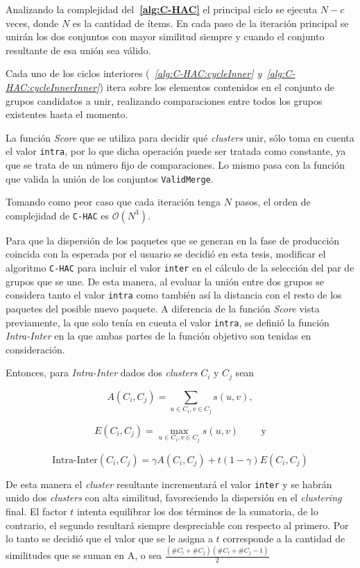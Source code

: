 Analizando la complejidad del\textbf{~\autoref{alg:C-HAC}} el principal ciclo se ejecuta $N - c$ veces, donde $N$ es la cantidad de ítems. En cada paso de la iteración principal se unirán los dos conjuntos con mayor similitud siempre y cuando el conjunto resultante de esa unión sea válido.

Cada uno de los ciclos interiores (\textit{~\autoref{alg:C-HAC:cycleInner} y~\autoref{alg:C-HAC:cycleInnerInner}}) itera sobre los elementos contenidos en el conjunto de grupos candidatos a unir, realizando comparaciones entre todos los grupos existentes hasta el momento. 

La función \textit{Score} que se utiliza para decidir qué {\em clusters} unir, sólo toma en cuenta el valor \texttt{intra}, por lo que dicha operación puede ser tratada como constante, ya que se trata de un número fijo de comparaciones. Lo mismo pasa con la función que valida la unión de los conjuntos \texttt{ValidMerge}.

Tomando como peor caso que cada iteración tenga $N$ pasos, el orden de complejidad de \texttt{C-HAC} es $\mathcal{O}(N^{3})$. 

Para que la dispersión de los paquetes que se generan en la fase de producción coincida con la esperada por el usuario se decidió en esta tesis, modificar el algoritmo \texttt{C-HAC} para incluir el valor \texttt{inter} en el cálculo de la selección del par de grupos que se une. De esta manera, al evaluar la unión entre dos grupos se considera tanto el valor \texttt{intra} como también así la distancia con el resto de los paquetes del posible nuevo paquete. A diferencia de la función \textit{Score} vista previamente, la que solo tenía en cuenta el valor \texttt{intra}, se definió la función \textit{Intra-Inter} en la que ambas partes de la función objetivo son tenidas en consideración. 

Entonces, para \textit{Intra-Inter} dados dos {\em clusters} $C_i$ y $C_j$ sean

$$A(C_i,C_j) = \sum_{u \in C_i, v \in C_j}{s(u,v)},$$

$$E(C_i,C_j)=\max_{u \in C_i, v \in C_j}{s(u,v)} \qquad \mbox{ y}$$

$$\mbox{Intra-Inter}(C_i,C_j) = \gamma A(C_i,C_j) + t (1-\gamma) E(C_i,C_j)$$

De esta manera el {\em cluster} resultante incrementará el valor \texttt{inter} y se habrán unido dos {\em clusters} con alta similitud, favoreciendo la dispersión en el {\em clustering} final. El factor $t$ intenta equilibrar los dos términos de la sumatoria, de lo contrario, el segundo resultará siempre despreciable con respecto al primero. Por lo tanto se decidió que el valor que se le asigna a $t$ corresponde a la cantidad de similitudes que se suman en A, o sea $\frac{(\#C_i + \#C_j) (\#C_i + \#C_j - 1)}{2}$  

